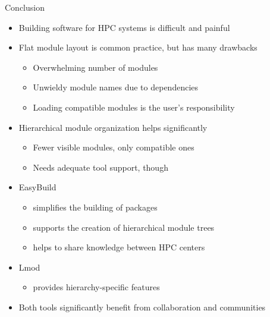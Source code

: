 \documentclass[10pt,xcolor={usenames,dvipsnames}]{beamer}
\begin{document}
\begin{frame}{Conclusion}
\begin{itemize}
    \item
        Building software for HPC systems is difficult and painful
    \item
        Flat module layout is common practice, but has many drawbacks
        \begin{itemize}
            \item
                Overwhelming number of modules
            \item
                Unwieldy module names due to dependencies
            \item
                Loading compatible modules is the user's responsibility
        \end{itemize}
    \item
        Hierarchical module organization helps significantly
        \begin{itemize}
            \item
                Fewer visible modules, only compatible ones
            \item
                Needs adequate tool support, though
        \end{itemize}
    \item
        EasyBuild
        \begin{itemize}
            \item
                simplifies the building of packages
            \item
                supports the creation of hierarchical module trees
            \item
                helps to share knowledge between HPC centers
        \end{itemize}
    \item
        Lmod
        \begin{itemize}
            \item
                provides hierarchy-specific features
        \end{itemize}
    \item
        Both tools significantly benefit from collaboration and
        communities
\end{itemize}
\end{frame}
\end{document}
